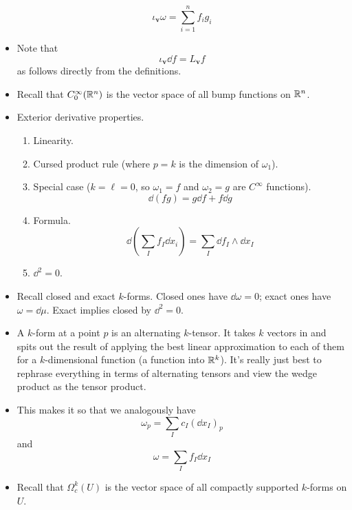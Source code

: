 \documentclass[../notes.tex]{subfiles}
\begin{document}
\begin{itemize}
\begin{equation*}
        \iota_{\bm{v}}\omega = \sum_{i=1}^nf_ig_i
    \end{equation*}
    \item Note that
    \begin{equation*}
        \iota_{\bm{v}}\dd f = L_{\bm{v}}f
    \end{equation*}
    as follows directly from the definitions.
    \item Recall that $C_0^\infty(\mathbb{R}^n)$ is the vector space of all bump functions on $\mathbb{R}^n$.
    \item Exterior derivative properties.
    \begin{enumerate}
        \item Linearity.
        \item Cursed product rule (where $p=k$ is the dimension of $\omega_1$).
        \item Special case ($k=\ell=0$, so $\omega_1=f$ and $\omega_2=g$ are $C^\infty$ functions).
        \begin{equation*}
            \dd(fg) = g\dd f+f\dd g
        \end{equation*}
        \item Formula.
        \begin{equation*}
            \dd(\sum_If_I\dd x_i) = \sum_I\dd f_I\wedge\dd x_I
        \end{equation*}
        \item $\dd^2=0$.
    \end{enumerate}
    \item Recall closed and exact $k$-forms. Closed ones have $\dd\omega=0$; exact ones have $\omega=\dd\mu$. Exact implies closed by $\dd^2=0$.
    \item A $k$-form at a point $p$ is an alternating $k$-tensor. It takes $k$ vectors in and spits out the result of applying the best linear approximation to each of them for a $k$-dimensional function (a function into $\mathbb{R}^k$). It's really just best to rephrase everything in terms of alternating tensors and view the wedge product as the tensor product.
    \item This makes it so that we analogously have
    \begin{equation*}
        \omega_p = \sum_Ic_I(\dd x_I)_p
    \end{equation*}
    and
    \begin{equation*}
        \omega = \sum_If_I\dd x_I
    \end{equation*}
    \item Recall that $\Omega_c^k(U)$ is the vector space of all compactly supported $k$-forms on $U$.

\end{itemize}
\end{document}

